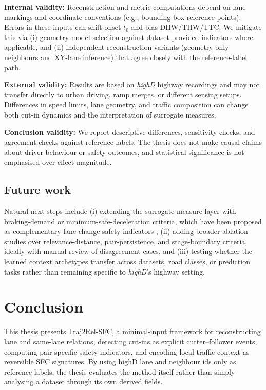 \documentclass[12pt,a4paper,twoside,openright]{report}
\newcommand{\FrameworkName}{Traj2Rel-SFC}
\begin{document}
    \textbf{Internal validity:} Reconstruction and metric computations depend on lane markings and coordinate conventions (e.g., bounding-box reference points). Errors in these inputs can shift onset $t_0$ and bias DHW/THW/TTC. We mitigate this via (i) geometry model selection against dataset-provided indicators where applicable, and (ii) independent reconstruction variants (geometry-only neighbours and XY-lane inference) that agree closely with the reference-label path.

    \textbf{External validity:} Results are based on \textit{highD} highway recordings and may not transfer directly to urban driving, ramp merges, or different sensing setups. Differences in speed limits, lane geometry, and traffic composition can change both cut-in dynamics and the interpretation of surrogate measures.

    \textbf{Conclusion validity:} We report descriptive differences, sensitivity checks, and agreement checks against reference labels. The thesis does not make causal claims about driver behaviour or safety outcomes, and statistical significance is not emphasised over effect magnitude.

    \section{Future work}
    Natural next steps include (i) extending the surrogate-measure layer with braking-demand or minimum-safe-deceleration criteria, which have been proposed as complementary lane-change safety indicators \cite{wang2020humanlike}, (ii) adding broader ablation studies over relevance-distance, pair-persistence, and stage-boundary criteria, ideally with manual review of disagreement cases, and (iii) testing whether the learned context archetypes transfer across datasets, road classes, or prediction tasks rather than remaining specific to \textit{highD}'s highway setting.

    \chapter{Conclusion}
    \label{chap:conclusion}

    This thesis presents \FrameworkName{}, a minimal-input framework for reconstructing lane and same-lane relations, detecting cut-ins as explicit cutter--follower events, computing pair-specific safety indicators, and encoding local traffic context as reversible SFC signatures. By using highD lane and neighbour ids only as reference labels, the thesis evaluates the method itself rather than simply analysing a dataset through its own derived fields.
\end{document}
